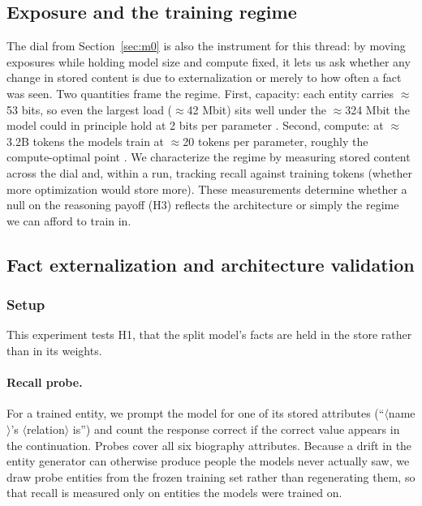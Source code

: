 \documentclass{article}
\begin{document}
\subsection{Exposure and the training regime}
\label{sec:m3}
The dial from Section~\ref{sec:m0} is also the instrument for this thread: by moving exposures while holding model size and compute fixed, it lets us ask whether any change in stored content is due to externalization or merely to how often a fact was seen. Two quantities frame the regime. First, capacity: each entity carries $\approx$53 bits, so even the largest load ($\approx$42 Mbit) sits well under the $\approx$324 Mbit the model could in principle hold at 2 bits per parameter \citep{allenzhu2024capacity}. Second, compute: at $\approx$3.2B tokens the models train at $\approx$20 tokens per parameter, roughly the compute-optimal point \citep{hoffmann2022chinchilla}. We characterize the regime by measuring stored content across the dial and, within a run, tracking recall against training tokens (whether more optimization would store more). These measurements determine whether a null on the reasoning payoff (H3) reflects the architecture or simply the regime we can afford to train in.


\FloatBarrier
\subsection{Fact externalization and architecture validation}
\label{sec:exp1}

\subsubsection{Setup}
This experiment tests H1, that the split model's facts are held in the store rather than in its weights.

\paragraph{Recall probe.} For a trained entity, we prompt the model for one of its stored attributes (``$\langle$name$\rangle$'s $\langle$relation$\rangle$ is'') and count the response correct if the correct value appears in the continuation. Probes cover all six biography attributes. Because a drift in the entity generator can otherwise produce people the models never actually saw, we draw probe entities from the frozen training set rather than regenerating them, so that recall is measured only on entities the models were trained on.
\end{document}
